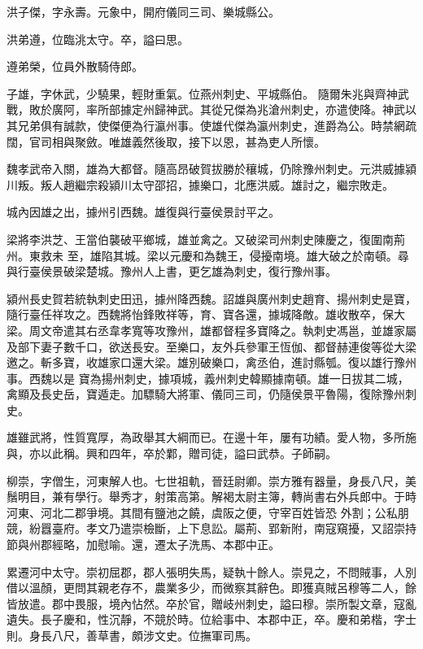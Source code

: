 \begin{pinyinscope}
 洪子傑，字永壽。元象中，開府儀同三司、樂城縣公。



 洪弟遵，位臨洮太守。卒，謚曰思。



 遵弟榮，位員外散騎侍郎。



 子雄，字休武，少驍果，輕財重氣。位燕州刺史、平城縣伯。
 隨爾朱兆與齊神武戰，敗於廣阿，率所部據定州歸神武。其從兄傑為兆滄州刺史，亦遣使降。神武以其兄弟俱有誠款，使傑便為行瀛州事。使雄代傑為瀛州刺史，進爵為公。時禁網疏闊，官司相與聚斂。唯雄義然後取，接下以恩，甚為吏人所懷。



 魏孝武帝入關，雄為大都督。隨高昂破賀拔勝於穰城，仍除豫州刺史。元洪威據潁川叛。叛人趙繼宗殺潁川太守邵招，據樂口，北應洪威。雄討之，繼宗敗走。



 城內因雄之出，據州引西魏。雄復與行臺侯景討平之。



 梁將李洪芝、王當伯襲破平鄉城，雄並禽之。又破梁司州刺史陳慶之，復圍南荊州。東救未
 至，雄陷其城。梁以元慶和為魏王，侵擾南境。雄大破之於南頓。尋與行臺侯景破梁楚城。豫州人上書，更乞雄為刺史，復行豫州事。



 潁州長史賀若統執刺史田迅，據州降西魏。詔雄與廣州刺史趙育、揚州刺史是寶，隨行臺任祥攻之。西魏將怡鋒敗祥等，育、寶各還，據城降敵。雄收散卒，保大梁。周文帝遣其右丞韋孝寬等攻豫州，雄都督程多寶降之。執刺史馮邕，並雄家屬及部下妻子數千口，欲送長安。至樂口，友外兵參軍王恆伽、都督赫連俊等從大梁邀之。斬多寶，收雄家口還大梁。雄別破樂口，禽丞伯，進討縣瓠。復以雄行豫州事。西魏以是
 寶為揚州刺史，據項城，義州刺史韓顯據南頓。雄一日拔其二城，禽顯及長史岳，寶遁走。加驃騎大將軍、儀同三司，仍隨侯景平魯陽，復除豫州刺史。



 雄雖武將，性質寬厚，為政舉其大綱而已。在邊十年，屢有功績。愛人物，多所施與，亦以此稱。興和四年，卒於鄴，贈司徒，謚曰武恭。子師嗣。



 柳崇，字僧生，河東解人也。七世祖軌，晉廷尉卿。崇方雅有器量，身長八尺，美鬚明目，兼有學行。舉秀才，射策高第。解褐太尉主簿，轉尚書右外兵郎中。于時河東、河北二郡爭境。其間有鹽池之饒，虞阪之便，守宰百姓皆恐
 外割；公私朋競，紛囂臺府。孝文乃遣崇檢斷，上下息訟。屬荊、郢新附，南寇窺擾，又詔崇持節與州郡經略，加慰喻。還，遷太子洗馬、本郡中正。



 累遷河中太守。崇初屈郡，郡人張明失馬，疑執十餘人。崇見之，不問賊事，人別借以溫顏，更問其親老存不，農業多少，而微察其辭色。即獲真賊呂穆等二人，餘皆放遣。郡中畏服，境內怗然。卒於官，贈岐州刺史，謚曰穆。崇所製文章，寇亂遺失。長子慶和，性沉靜，不競於時。位給事中、本郡中正，卒。慶和弟楷，字士則。身長八尺，善草書，頗涉文史。位撫軍司馬。




\end{pinyinscope}
